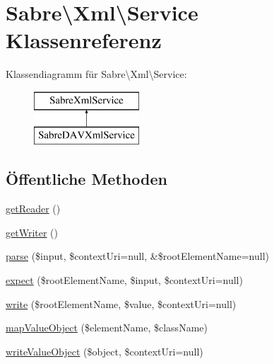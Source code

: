 \hypertarget{class_sabre_1_1_xml_1_1_service}{}\section{Sabre\textbackslash{}Xml\textbackslash{}Service Klassenreferenz}
\label{class_sabre_1_1_xml_1_1_service}
Klassendiagramm für Sabre\textbackslash{}Xml\textbackslash{}Service\+:\begin{figure}[H]
\begin{center}
\leavevmode
\includegraphics[height=2.000000cm]{class_sabre_1_1_xml_1_1_service}
\end{center}
\end{figure}
\subsection*{Öffentliche Methoden}
\begin{DoxyCompactItemize}
\item 
\mbox{\hyperlink{class_sabre_1_1_xml_1_1_service_ae35b9eb37840ddd46780e21f5869cbcf}{get\+Reader}} ()
\item 
\mbox{\hyperlink{class_sabre_1_1_xml_1_1_service_ae31e73ea53c5bdbfb46bc1c0f013307b}{get\+Writer}} ()
\item 
\mbox{\hyperlink{class_sabre_1_1_xml_1_1_service_abd3ed5e5ca82193ab2499e94868dd555}{parse}} (\$input, \$context\+Uri=null, \&\$root\+Element\+Name=null)
\item 
\mbox{\hyperlink{class_sabre_1_1_xml_1_1_service_a0a0c8c86215a25cbaa71418a6bd08541}{expect}} (\$root\+Element\+Name, \$input, \$context\+Uri=null)
\item 
\mbox{\hyperlink{class_sabre_1_1_xml_1_1_service_a92af6e84cf7218c36bcbaaef4156b033}{write}} (\$root\+Element\+Name, \$value, \$context\+Uri=null)
\item 
\mbox{\hyperlink{class_sabre_1_1_xml_1_1_service_a9dd6c5eb721775a3fec5f749c89e35ce}{map\+Value\+Object}} (\$element\+Name, \$class\+Name)
\item 
\mbox{\hyperlink{class_sabre_1_1_xml_1_1_service_a17fc0693945e665d84a2f8e8e515285c}{write\+Value\+Object}} (\$object, \$context\+Uri=null)
\end{DoxyCompactItemize}

